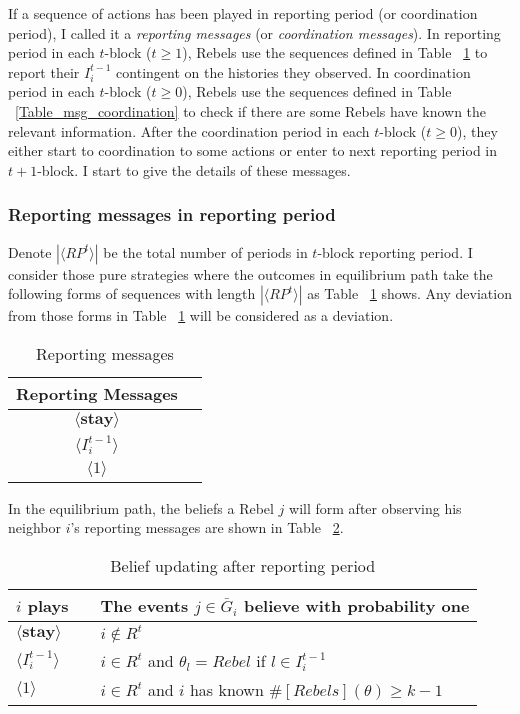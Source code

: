 \documentclass[12pt,letter]{article}
\theoremstyle{definition}
\theoremstyle{remark}
\theoremstyle{claim}
\begin{document}
If a sequence of actions has been played in reporting period (or coordination period), I called it a \textit{reporting messages} (or \textit{coordination messages}). In reporting period in each $t$-block ($t\geq 1$), Rebels use the sequences defined in Table ~\ref{Table_msg_reporting} to report their $I^{t-1}_i$ contingent on the histories they observed. In coordination period in each $t$-block ($t\geq 0$), Rebels use the sequences defined in Table ~\ref{Table_msg_coordination} to check if there are some Rebels have known the relevant information. After the coordination period in each $t$-block ($t\geq 0$), they either start to coordination to some actions or enter to next reporting period in $t+1$-block. I start to give the details of these messages.



\subsubsection*{Reporting messages in reporting period}

Denote $|\langle RP^t \rangle|$ be the total number of periods in $t$-block reporting period. I consider those pure strategies where the outcomes in equilibrium path take the following forms of sequences with length $|\langle RP^t \rangle|$ as Table ~\ref{Table_msg_reporting} shows. Any deviation from those forms in Table ~\ref{Table_msg_reporting} will be considered as a deviation. 

\begin{table}[ht]
\caption{Reporting messages}
\label{Table_msg_reporting}
\begin{center}
\begin{tabular}{c c }
Reporting Messages 		&   \\
\hline
$\langle  \textbf{stay} \rangle$ 	& 	 \\
$\langle  {I^{t-1}_i} \rangle$ 		&   \\
$\langle 1 \rangle$ 		             &    
\end{tabular}
\end{center}
\end{table}
In the equilibrium path, the beliefs a Rebel $j$ will form after observing his neighbor $i$'s reporting messages are shown in Table ~\ref{Table_blf_up_reporting}.

\begin{table}[ht]
\caption{Belief updating after reporting period}
\label{Table_blf_up_reporting}
\begin{center}
\begin{tabular}{l c l}
$i$ plays 		&  			& The events $j\in \bar{G}_i$ believe with probability one  \\
\hline
$\langle  \textbf{stay} \rangle$ 	& 			    & $i\notin R^t$  \\
$\langle  {I^{t-1}_i} \rangle$ 		&  			& $i\in R^t$ and $\theta_l=Rebel$ if $l\in I^{t-1}_i$      \\
$\langle 1 \rangle$ 		             &  			& $i\in R^t$ and $i$ has known $\#[Rebels](\theta)\geq k-1$ \\
\end{tabular}
\end{center}
\end{table}
\end{document}
